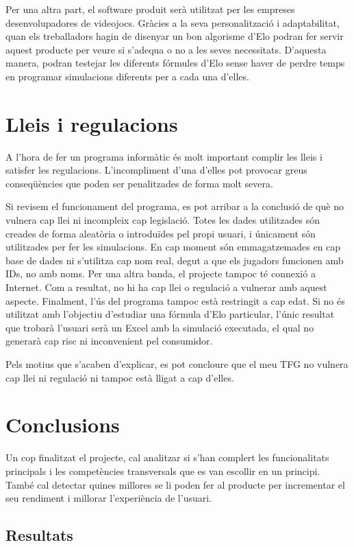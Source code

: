 \documentclass[a4paper]{article}
\begin{document}
Per una altra part, el software produit serà utilitzat per les empreses desenvolupadores de videojocs. Gràcies a la seva personalització i adaptabilitat, quan els treballadors hagin de disenyar un bon algorisme d'Elo podran fer servir aquest producte per veure si s'adequa o no a les seves necessitats. D'aquesta manera, podran testejar les diferents fórmules d'Elo sense haver de perdre temps en programar simulacions diferents per a cada una d'elles.

\newpage
\section{Lleis i regulacions}
A l'hora de fer un programa informàtic és molt important complir les lleis i satisfer les regulacions. L'incompliment d'una d'elles pot provocar greus conseqüències que poden ser penalitzades de forma molt severa. 

Si revisem el funcionament del  programa, es pot arribar a la conclusió de què no vulnera cap llei ni incompleix cap legislació. Totes les dades utilitzades són creades de forma aleatòria o introduïdes pel propi usuari, i únicament són utilitzades per fer les simulacions. En cap moment són emmagatzemades en cap base de dades ni s'utilitza cap nom real, degut a que els jugadors funcionen amb IDs, no amb noms. 
Per una altra banda, el projecte tampoc té connexió a Internet. Com a resultat, no hi ha cap llei o regulació a vulnerar amb aquest aspecte. Finalment, l'ús del programa tampoc està restringit a cap edat. Si no és utilitzat amb l'objectiu d'estudiar una fórmula d'Elo particular, l'únic resultat que trobarà l'usuari serà un Excel amb la simulació executada, el qual no generarà cap risc ni inconvenient pel consumidor.

Pels motius que s'acaben d'explicar, es pot concloure que el meu TFG no vulnera cap llei ni regulació ni tampoc està lligat a cap d'elles.

\newpage
\section{Conclusions}

Un cop finalitzat el projecte, cal analitzar si s'han complert les funcionalitats principals i les competències transversals que es van escollir en un principi. També cal detectar quines millores se li poden fer al producte per incrementar el seu rendiment i millorar l'experiència de l'usuari.

\subsection{Resultats}
\end{document}
